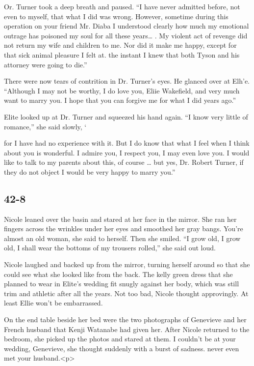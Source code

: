 \documentclass[]{article}
\begin{document}
{Or. Turner took a deep breath and paused. “I have never admitted before, not even to myself, that what I did was wrong. However, sometime during this operation on your friend Mr. Diaba I understood clearly how much my emotional outrage has poisoned my soul for all these years… . My violent act of revenge did not return my wife and children to me. Nor did it make me happy, except for that sick animal pleasure I felt at. the instant I knew that both Tyson and his attorney were going to die.”

There were now tears of contrition in Dr. Turner’s eyes. He glanced over at Elh’e. “Although I may not be worthy, I do love you, Eliie Wakefield, and very much want to marry you. I hope that you can forgive me for what I did years ago.”

Elite looked up at Dr. Turner and squeezed his hand again. “I know very little of romance,” she said slowly, ‘

for I have had no experience with it. But I do know that what I feel when I think about you is wonderful. I admire you, I respect you, I may even love you. I would like to talk to my parents about this, of course … but yes, Dr. Robert Turner, if they do not object I would be very happy to marry you.”


\subsection{42-8}

Nicole leaned over the basin and stared at her face in the mirror. She ran her fingers across the wrinkles under her eyes and smoothed her gray bangs. You’re almost an old woman, she said to herself. Then she smiled. “I grow old, I grow old, I shall wear the bottoms of my trousers rolled,” she said out loud.

Nicole laughed and backed up from the mirror, turning herself around so that she could see what she looked like from the back. The kelly green dress that she planned to wear in Elite’s wedding fit snugly against her body, which was still trim and athletic after all the years. Not too bad, Nicole thought approvingly. At least Ellie won’t be embarrassed.

On the end table beside her bed were the two photographs of Genevieve and her French husband that Kenji Watanabe had given her. After Nicole returned to the bedroom, she picked up the photos and stared at them. I couldn’t be at your wedding, Genevieve, she thought suddenly with a burst of sadness. never even met your husband.<p>

}
\end{document}
